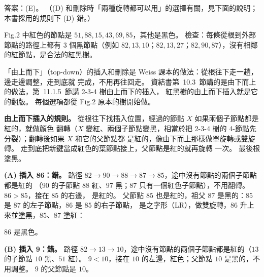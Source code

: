 \begin{pastsoln}
答案：(E)。 （(D) 和刪除時「兩種旋轉都可以用」的選擇有關，見下面的說明；本書採用的規則下 (D) 錯。）

Fig.2 中紅色的節點是 $51, 88, 15, 43, 69, 85$，其他是黑色。 檢查：每條從根到外部節點的路徑上都有
$3$ 個黑節點（例如 $82, 13, 10$；$82, 13, 27$；$82, 90, 87$），沒有相鄰的紅節點，是合法的紅黑樹。

「由上而下」（top-down）的插入和刪除是 Weiss 課本的做法：從根往下走一趟，邊走邊調整，走到底就
完成，不用再往回走。 資結書第~10.3~節講的是由下而上的做法，第~11.1.5~節講 2-3-4 樹由上而下的插入，
紅黑樹的由上而下插入就是它的翻版。 每個選項都從 Fig.2 原本的樹開始做。

\textbf{由上而下插入的規則。} 從根往下找插入位置，經過的節點 $X$ 如果兩個子節點都是紅的，就做顏色
翻轉（$X$ 變紅、兩個子節點變黑，相當於把 2-3-4 樹的 4-節點先分裂）；翻轉後如果 $X$ 和它的父節點都
是紅的，像由下而上那樣做單旋轉或雙旋轉。 走到底把新鍵當成紅色的葉節點接上，父節點是紅的就再旋轉
一次。 最後根塗黑。

\textbf{(A) 插入 86：錯。} 路徑 $82 \to 90 \to 88 \to 87 \to 85$，途中沒有節點的兩個子節點都是紅的
（$90$ 的子節點 $88$ 紅、$97$ 黑；$87$ 只有一個紅色子節點），不用翻轉。 $86 > 85$，接在 $85$ 的右邊，
是紅的。 父節點 $85$ 也是紅的，祖父 $87$ 是黑的：$85$ 是 $87$ 的左子節點，$86$ 是 $85$ 的右子節點，
是之字形（LR），做雙旋轉，$86$ 升上來並塗黑，$85$、$87$ 塗紅：
\begin{center}
\end{center}
$86$ 是黑色。

\textbf{(B) 插入 9：錯。} 路徑 $82 \to 13 \to 10$，途中沒有節點的兩個子節點都是紅的（$13$ 的子節點 $10$
黑、$51$ 紅）。 $9 < 10$，接在 $10$ 的左邊，紅色；父節點 $10$ 是黑的，不用調整。 $9$ 的父節點是 $10$。


\end{pastsoln}
